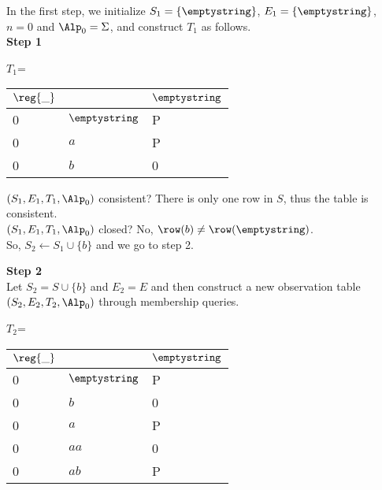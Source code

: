 In the first step, we initialize $S_1=\{\emptystring\}$, $E_1= \{\emptystring\}$, $n=0$ and ${\Alp_0}=\Sigma$, and construct $T_1$ as follows.\\
\textbf{Step 1}\\
\begin{minipage}{0.5\textwidth}
  \begin{center}
    $T_1$=
    \begin{tabular}{l|l|l}
      
      {$\reg{\_}$}  &{}  &      {$\emptystring$} \\
      \hline
      {0}  &  ${\emptystring}$ & {P} \\
      \hline
      {0}  & {$a$} & {P} \\
      {0}  &{$b$} & {0}\\
      
    \end{tabular}
  \end{center}
\end{minipage}
\begin{minipage}{0.5\textwidth}
  $(S_1,E_1,T_1,{\Alp_0})$ consistent?  There is only one row in $S$, thus the table is consistent.\\
  $(S_1,E_1,T_1,{\Alp_0})$ closed? No, $\row(b)\neq \row(\emptystring)$.\\
  So, $S_2\leftarrow S_1\cup \{b\}$ and we go to step 2.
\end{minipage}
\textbf{Step 2}\\
Let $S_2= S\cup \{b\}$ and $E_2=E$ and then construct a new observation table $(S_2,E_2,T_2,{\Alp_0})$ through membership queries.\\
\begin{minipage}{0.5\textwidth}
  \begin{center}
    $T_2$=
    \begin{tabular}{l|l|l}
      
      {$\reg{\_}$}  &{}  &      {$\emptystring$} \\
      \hline
      {0}  & ${\emptystring}$ & {P} \\
      {0}  &{$b$} & {0} \\
      \hline
      {0}  &{$a$} & {P}\\
      {0}  &{$aa$} & {0}\\
      {0}  &{$ab$} & {P}\\
    \end{tabular}
  \end{center}
\end{minipage}
